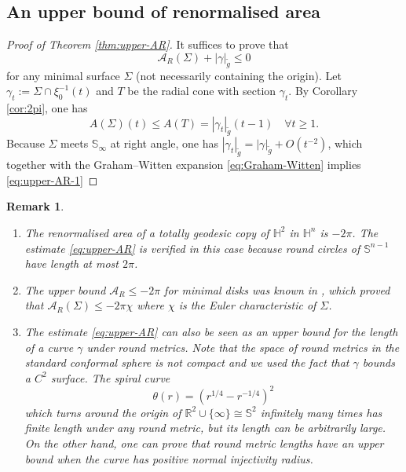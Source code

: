 \documentclass[11pt]{article}
\newtheorem{remark}[theorem]{Remark}
\begin{document}
\subsection{An upper bound of renormalised area}
\label{sec:org43c0564}
\begin{proof}[Proof of Theorem \ref{thm:upper-AR}]
It suffices to prove that 
\begin{equation}
\label{eq:upper-AR-1}
\mathcal{A}_R(\Sigma) + |\gamma|_{\tilde g}\leq 0
\end{equation}
for any minimal surface \(\Sigma\) (not necessarily containing the origin). Let \(\gamma_t
:= \Sigma\cap\xi_0^{-1}(t)\) and \(T\) be the radial cone 
with section \(\gamma_t\). By Corollary \ref{cor:2pi}, one has 
\[
A(\Sigma)(t) \leq A(T) = |\gamma_t|_{\tilde g} (t-1) \quad\forall t \geq 1.
\]
Because \(\Sigma\) meets \(\mathbb{S}_\infty\) at right angle, one has \(\left|\gamma_t\right|_{\tilde g} = |\gamma|_{\tilde g} + O(t^{-2})\), which together with the Graham--Witten expansion \ref{eq:Graham-Witten} implies \eqref{eq:upper-AR-1}
\end{proof}

\begin{remark}
\label{rem:upper-AR}
\begin{enumerate}
\item The renormalised area of a totally geodesic copy of \(\mathbb{H}^2\) in \(\mathbb{H}^n\) is \(-2\pi\). The estimate \eqref{eq:upper-AR} is verified in this case because round circles of \(\mathbb{S}^{n-1}\) have length
at most \(2\pi\).
\item The upper bound \(\mathcal{A}_R\leq -2\pi\) for
minimal disks was known in \cite{Alexakis.Mazzeo10_RenormalizedAreaProperly}, which proved that \(\mathcal{A}_R(\Sigma) \leq
   -2\pi\chi\) where
\(\chi\) is the Euler characteristic of \(\Sigma\).
\item The estimate \eqref{eq:upper-AR} can also be seen as an upper bound for the length of a
curve \(\gamma\) under round metrics. 
Note that the space of round metrics in the standard conformal sphere is not compact
and we used the fact that \(\gamma\)
bounds a \(C^2\) surface. The spiral curve
\begin{equation}
\label{eq:spiral}
\theta(r) = \left(r^{1/4} - r^{-1/4}\right)^2   
\end{equation}
which turns around the origin of \(\mathbb{R}^2\cup\{\infty\}\cong \mathbb{S}^2\) infinitely many times has finite length
under any round metric, but its length can be arbitrarily large. On the other hand, one
can prove that round metric lengths have an upper bound when the curve has positive normal injectivity radius.
\end{enumerate}
\end{remark}
\end{document}
